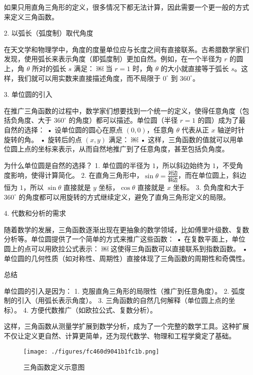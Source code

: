 如果只用直角三角形的定义，很多情况下都无法计算，因此需要一个更一般的方式来定义三角函数。

2. 以弧长（弧度制）取代角度

在天文学和物理学中，角度的度量单位应与长度之间有直接联系。古希腊数学家们发现，使用弧长来表示角度（即弧度制）更加自然。例如，在一个半径为 $r$ 的圆上，角 $\theta$ 所对的弧长 $s$ 满足：
￼
当 $r = 1$ 时，角 $\theta$ 的大小就直接等于弧长 $s$。这样，我们就可以用实数来直接描述角度，而不局限于 $0^\circ$ 到 $360^\circ$。

3. 单位圆的引入

在推广三角函数的过程中，数学家们想要找到一个统一的定义，使得任意角度（包括负角度、大于 $360^\circ$ 的角度）都可以描述。单位圆（半径 $r = 1$ 的圆）成为了最自然的选择：
	•	设单位圆的圆心在原点 $(0,0)$，任意角 $\theta$ 代表从正 $x$ 轴逆时针旋转的角。
	•	旋转后的点 $(x, y)$ 满足：
￼
	•	这样，三角函数的值就可以用单位圆上点的坐标来表示，从而自然地推广到了任意角度，甚至包括负角度。

为什么单位圆是自然的选择？
	1.	单位圆的半径为 $1$，所以斜边始终为 $1$，不受角度影响，使得计算简化。
	2.	在直角三角形中，$\sin\theta = \frac{\text{对边}}{\text{斜边}}$，而在单位圆上，斜边恒为 $1$，所以 $\sin\theta$ 直接就是 $y$ 坐标，$\cos\theta$ 直接就是 $x$ 坐标。
	3.	负角度和大于 $360^\circ$ 的角度都可以用旋转的方式继续定义，避免了直角三角形定义的局限。

4. 代数和分析的需求

随着数学的发展，三角函数逐渐出现在更抽象的数学领域，比如傅里叶级数、复数分析等。单位圆提供了一个简单的方式来推广这些函数：
	•	在复数平面上，单位圆上的点可以用欧拉公式表示：
￼
这使得三角函数可以直接联系到指数函数。
	•	单位圆的几何性质（如对称性、周期性）直接体现了三角函数的周期性和奇偶性。

总结

单位圆的引入是因为：
	1.	克服直角三角形的局限性（推广到任意角度）。
	2.	弧度制的引入（用弧长表示角度）。
	3.	三角函数的自然几何解释（单位圆上点的坐标）。
	4.	方便代数推广（如欧拉公式、复数分析）。

这样，三角函数从测量学扩展到数学分析，成为了一个完整的数学工具。这种扩展不仅让定义更自然、计算更简单，还为现代数学、物理和工程学奠定了基础。

\begin{figure}[ht]
\centering
\texttt{[image: ./figures/fc460d9041b1fc1b.png]}
\caption{三角函数定义示意图} \label{fig_HsTrFu_5}
\end{figure}

